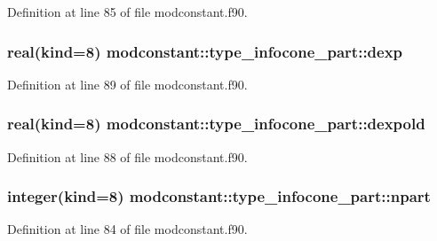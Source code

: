 Definition at line 85 of file modconstant.\+f90.

\subsubsection[{\texorpdfstring{dexp}{dexp}}]{\setlength{\rightskip}{0pt plus 5cm}real(kind=8) modconstant\+::type\+\_\+infocone\+\_\+part\+::dexp}\hypertarget{structmodconstant_1_1type__infocone__part_a0395444224fda81aaed35febb5cc9d82}{}\label{structmodconstant_1_1type__infocone__part_a0395444224fda81aaed35febb5cc9d82}


Definition at line 89 of file modconstant.\+f90.

\subsubsection[{\texorpdfstring{dexpold}{dexpold}}]{\setlength{\rightskip}{0pt plus 5cm}real(kind=8) modconstant\+::type\+\_\+infocone\+\_\+part\+::dexpold}\hypertarget{structmodconstant_1_1type__infocone__part_af5a8f128638e0474edb01932dfd4dec7}{}\label{structmodconstant_1_1type__infocone__part_af5a8f128638e0474edb01932dfd4dec7}


Definition at line 88 of file modconstant.\+f90.

\subsubsection[{\texorpdfstring{npart}{npart}}]{\setlength{\rightskip}{0pt plus 5cm}integer(kind=8) modconstant\+::type\+\_\+infocone\+\_\+part\+::npart}\hypertarget{structmodconstant_1_1type__infocone__part_a7316d0f4db343f9dc87c45f241642f4f}{}\label{structmodconstant_1_1type__infocone__part_a7316d0f4db343f9dc87c45f241642f4f}


Definition at line 84 of file modconstant.\+f90.

